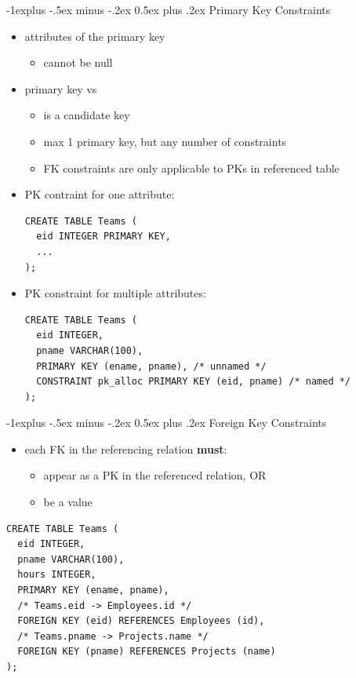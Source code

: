 \documentclass[10pt, landscape]{article}
\makeatletter
\renewcommand{\subsection}{\@startsection{subsection}{2}{0mm}%
  {-1explus -.5ex minus -.2ex}%
  {0.5ex plus .2ex}%
{\normalfont\normalsize\bfseries}}
\makeatother
\begin{document}
\begin{multicols}{3}
  \subsection{Primary Key Constraints}
  \begin{itemize}
    \item {} attributes of the primary key 
      \begin{itemize}
        \item cannot be null
      \end{itemize}
    \item primary key vs 
      \begin{itemize}
        \item {} is a candidate key
        \item max 1 primary key, but any number of  constraints
        \item FK constraints are only applicable to PKs in referenced table
      \end{itemize}
    \item PK contraint for one attribute:
      \begin{lstlisting}[style=mySQL]
CREATE TABLE Teams (
  eid INTEGER PRIMARY KEY, 
  ... 
);
      \end{lstlisting}
    \item PK constraint for multiple attributes:
      \begin{lstlisting}[style=mySQL]
CREATE TABLE Teams (
  eid INTEGER,
  pname VARCHAR(100),
  PRIMARY KEY (ename, pname), /* unnamed */
  CONSTRAINT pk_alloc PRIMARY KEY (eid, pname) /* named */
);
      \end{lstlisting}
  \end{itemize}

  \subsection{Foreign Key Constraints}
  \begin{itemize}
    \item each FK in the referencing relation \textbf{must}:
      \begin{itemize}
        \item appear as a PK in the referenced relation, OR
        \item be a  value
      \end{itemize}
  \end{itemize}
  \begin{lstlisting}[style=mySQL]
CREATE TABLE Teams (
  eid INTEGER,
  pname VARCHAR(100),
  hours INTEGER,
  PRIMARY KEY (ename, pname),
  /* Teams.eid -> Employees.id */
  FOREIGN KEY (eid) REFERENCES Employees (id), 
  /* Teams.pname -> Projects.name */
  FOREIGN KEY (pname) REFERENCES Projects (name)
);
  \end{lstlisting}


\end{multicols}
\end{document}
